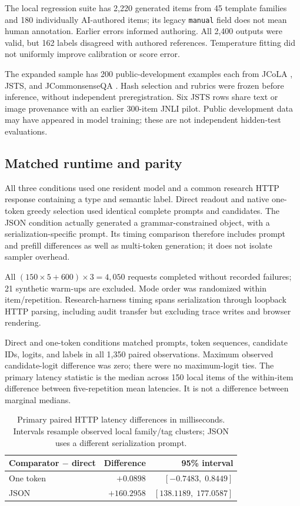 \documentclass[11pt]{article}
\begin{document}
The local regression suite has 2,220 generated items from 45 template families and 180 individually AI-authored items; its legacy \texttt{manual} field does not mean human annotation. Earlier errors informed authoring. All 2,400 outputs were valid, but 162 labels disagreed with authored references. Temperature fitting did not uniformly improve calibration or score error.

The expanded sample has 200 public-development examples each from JCoLA \citep{someya2024jcola}, JSTS, and JCommonsenseQA \citep{kurihara2022jglue}. Hash selection and rubrics were frozen before inference, without independent preregistration. Six JSTS rows share text or image provenance with an earlier 300-item JNLI pilot. Public development data may have appeared in model training; these are not independent hidden-test evaluations.

\subsection{Matched runtime and parity}
All three conditions used one resident model and a common research HTTP response containing a type and semantic label. Direct readout and native one-token greedy selection used identical complete prompts and candidates. The JSON condition actually generated a grammar-constrained object, with a serialization-specific prompt. Its timing comparison therefore includes prompt and prefill differences as well as multi-token generation; it does not isolate sampler overhead.

All $(150\times5+600)\times3=4{,}050$ requests completed without recorded failures; 21 synthetic warm-ups are excluded. Mode order was randomized within item/repetition. Research-harness timing spans serialization through loopback HTTP parsing, including audit transfer but excluding trace writes and browser rendering.

Direct and one-token conditions matched prompts, token sequences, candidate IDs, logits, and labels in all 1,350 paired observations. Maximum observed candidate-logit difference was zero; there were no maximum-logit ties. The primary latency statistic is the median across 150 local items of the within-item difference between five-repetition mean latencies. It is not a difference between marginal medians.

\begin{table}[t]
\centering
\small
\setlength{\tabcolsep}{3pt}
\begin{tabular}{@{}lrr@{}}
\toprule
Comparator $-$ direct & Difference & 95\% interval \\
\midrule
One token & $+0.0898$ & $[-0.7483,\;0.8449]$ \\
JSON & $+160.2958$ & $[138.1189,\;177.0587]$ \\
\bottomrule
\end{tabular}
\caption{Primary paired HTTP latency differences in milliseconds. Intervals resample observed local family/tag clusters; JSON uses a different serialization prompt.}
\label{tab:latency}
\end{table}
\end{document}

